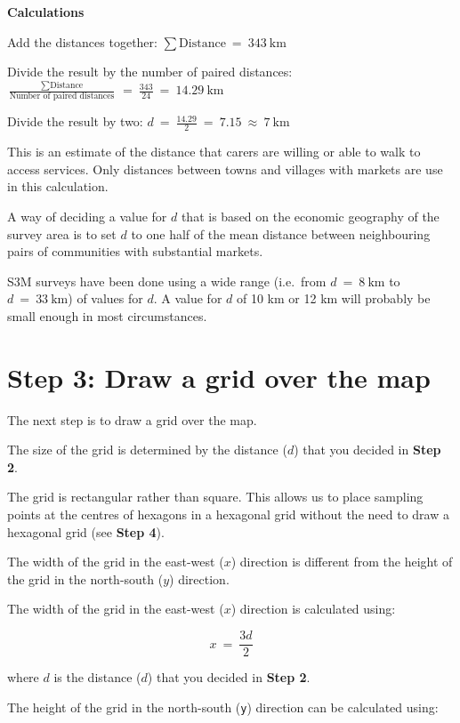 \documentclass[12pt,a4paper]{book}
\theoremstyle{definition}
\theoremstyle{definition}
\theoremstyle{definition}
\theoremstyle{remark}
\let\BeginKnitrBlock\begin \let\EndKnitrBlock\end
\begin{document}
\BeginKnitrBlock{rmdnote}
\textbf{Calculations}

Add the distances together:
\(\sum \text{Distance} ~ = ~ 343 ~ \text{km}\)

Divide the result by the number of paired distances:
\(\frac{\sum \text{Distance}}{\text{Number of paired distances}} ~ = ~ \frac{343}{24} ~ = ~ 14.29 ~ \text{km}\)

Divide the result by two:
\(d ~ = ~ \frac{14.29}{2} ~ = ~ 7.15 ~ \approx ~ 7 ~ \text{km}\)
\EndKnitrBlock{rmdnote}

This is an estimate of the distance that carers are willing or able to
walk to access services. Only distances between towns and villages with
markets are use in this calculation.

A way of deciding a value for \(d\) that is based on the economic
geography of the survey area is to set \(d\) to one half of the mean
distance between neighbouring pairs of communities with substantial
markets.

S3M surveys have been done using a wide range (i.e.~from
\(d ~ = ~ 8 ~ \text{km}\) to \(d ~ = ~ 33 ~ \text{km}\)) of values for
\(d\). A value for \(d\) of 10 km or 12 km will probably be small enough
in most circumstances.

\hypertarget{step-3-draw-a-grid-over-the-map}{%
\section{Step 3: Draw a grid over the
map}\label{step-3-draw-a-grid-over-the-map}}

The next step is to draw a grid over the map.

The size of the grid is determined by the distance (\(d\)) that you
decided in \textbf{Step 2}.

The grid is rectangular rather than square. This allows us to place
sampling points at the centres of hexagons in a hexagonal grid without
the need to draw a hexagonal grid (see \textbf{Step 4}).

The width of the grid in the east-west (\(x\)) direction is different
from the height of the grid in the north-south (\(y\)) direction.

The width of the grid in the east-west (\(x\)) direction is calculated
using:

\[ x ~ = ~ \frac{3d}{2} \]

where \(d\) is the distance (\(d\)) that you decided in \textbf{Step 2}.

The height of the grid in the north-south (\texttt{y}) direction can be
calculated using:
\end{document}
